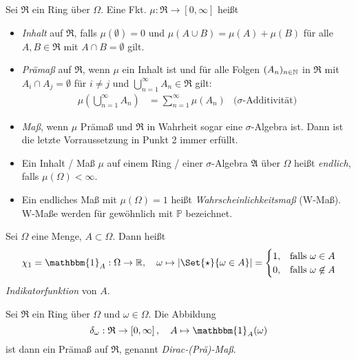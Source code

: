 \documentclass{cheat-sheet}
\newcommand{\Alg}{\mathfrak{A}} %
\newcommand{\Ring}{\mathfrak{R}} %
\renewcommand{\P}{\mathbb{P}} %
\newcommand{\ind}{\mathbbm{1}} %
\begin{document}
\begin{defn}
  Sei $\Ring$ ein Ring über $\Omega$. Eine Fkt. $\mu : \Ring \to \left[ 0, \infty \right]$ heißt
  \begin{itemize}
    \item \emph{Inhalt} auf $\Ring$, falls $\mu(\emptyset) = 0$ und $\mu(A \cup B) = \mu(A) + \mu(B)$ für alle $A, B \in \Ring$ mit $A \cap B = \emptyset$ gilt.
    \item \emph{Prämaß} auf $\Ring$, wenn $\mu$ ein Inhalt ist und für alle Folgen $(A_n)_{n \in \mathbb{N}}$ in $\Ring$ mit $A_i \cap A_j = \emptyset$ für $i \not= j$ und $\bigcup_{n=1}^\infty A_n \in \Ring$ gilt:
    \begin{align*}
      \mu \left( \bigcup_{n=1}^\infty A_n \right) &= \sum_{n=1}^\infty \mu(A_n) & \text{($\sigma$-Additivität)}
    \end{align*}
    \item \emph{Maß}, wenn $\mu$ Prämaß und $\Ring$ in Wahrheit sogar eine $\sigma$-Algebra ist. Dann ist die letzte Vorraussetzung in Punkt 2 immer erfüllt.
  \end{itemize}
\end{defn}

\begin{defn}
  \begin{itemize}
    \item Ein Inhalt / Maß $\mu$ auf einem Ring / einer $\sigma$-Algebra $\Alg$ über $\Omega$ heißt \emph{endlich}, falls $\mu(\Omega) < \infty$.
    \item Ein endliches Maß mit $\mu(\Omega) = 1$ heißt \emph{Wahrscheinlichkeitsmaß} (W-Maß). W-Maße werden für gewöhnlich mit $\P$ bezeichnet.
  \end{itemize}
\end{defn}

\begin{nota}
  Sei $\Omega$ eine Menge, $A \subset \Omega$. Dann heißt
  \[ \chi_1 = \ind_A : \Omega \to \R, \quad \omega \mapsto \abs{\Set{ \star }{ \omega \in A }} =
  \begin{cases}
    1, & \text{falls } \omega \in A \\
    0, & \text{falls } \omega \not\in A
  \end{cases} \]
  \emph{Indikatorfunktion} von $A$.
\end{nota}

\begin{bsp}
  Sei $\Ring$ ein Ring über $\Omega$ und $\omega \in \Omega$. Die Abbildung
  \[ \delta_{\omega} : \Ring \to \left[ 0, \infty \right], \quad A \mapsto \ind_A(\omega) \]
  ist dann ein Prämaß auf $\Ring$, genannt \emph{Dirac-(Prä)-Maß}.
\end{bsp}
\end{document}
